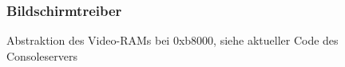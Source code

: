 \subsubsection{Bildschirmtreiber}

Abstraktion des Video-RAMs bei 0xb8000, siehe aktueller Code des Consoleservers
